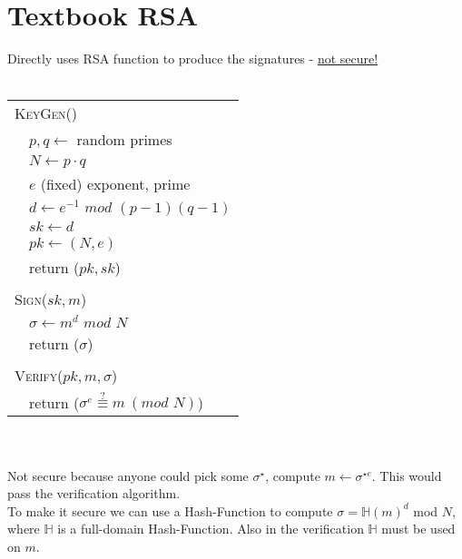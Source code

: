 \documentclass{report}
\begin{document}
\section{Textbook RSA}
\begin{adjustwidth}{2em}{2em}
	Directly uses RSA function to produce the signatures - \underline{not secure!} \\ \\
	\begin{tabular}{ll}
		\multicolumn{2}{l}{\textsc{KeyGen}()} \\
		& $p,q \leftarrow $ random primes \\
		& $N \leftarrow p \cdot q$ \\
		& $e$ (fixed) exponent, prime \\
		& $d \leftarrow e^{-1} \textit{ mod } (p-1)(q-1)$ \\
		& $sk \leftarrow d$ \\
		& $pk \leftarrow (N, e)$ \\
		& return ($pk, sk$) \\
		\\
		\multicolumn{2}{l}{\textsc{Sign}($sk, m$)} \\
		& $\sigma \leftarrow m^d \textit{ mod } N$ \\
		& return ($\sigma$) \\
		\\
		\multicolumn{2}{l}{\textsc{Verify}($pk, m, \sigma$)} \\
		& return ($\sigma ^e \stackrel{?}{\equiv} m \ (\textit{mod } N)$) \\
	\end{tabular} \\
	\hfill \\
	Not secure because anyone could pick some $\sigma ^{\star}$, compute $m \leftarrow \sigma ^{\star e}$. This would pass the verification algorithm. \\
	To make it secure we can use a Hash-Function to compute $\sigma = \mathbb{H}(m)^d$ mod $N$, where $\mathbb{H}$ is a full-domain Hash-Function. Also in the verification $\mathbb{H}$ must be used on $m$.
\end{adjustwidth}
\end{document}

